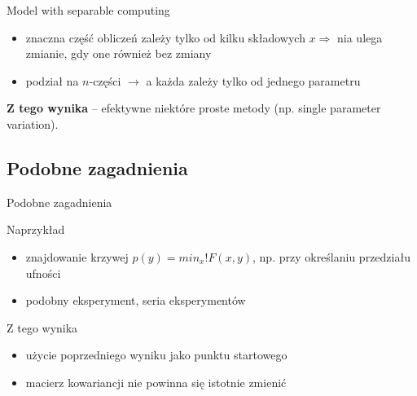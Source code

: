   \begin{frame}{Model with separable computing}
    \begin{itemize}
      \item znaczna część obliczeń zależy tylko od kilku
      składowych $x \Rightarrow$ nia ulega zmianie, gdy
      one również bez zmiany
      \item podział na $n$-części $\to$ a każda zależy tylko
      od jednego parametru
    \end{itemize}
    \textbf{Z tego wynika} -- efektywne niektóre proste
    metody (np. single parameter variation).
  \end{frame}

\subsection{Podobne zagadnienia}

  \begin{frame}{Podobne zagadnienia}
    \begin{exampleblock}{Naprzykład}
      \begin{itemize}
        \item znajdowanie krzywej $p(y)=min_{x}!F(x,y)$,
        np. przy określaniu przedziału ufności
        \item podobny eksperyment, seria eksperymentów
      \end{itemize}
    \end{exampleblock}
    \begin{block}{Z tego wynika}
      \begin{itemize}
        \item użycie poprzedniego wyniku jako punktu startowego
        \item macierz kowariancji nie powinna się istotnie zmienić
      \end{itemize}
    \end{block}
  \end{frame}
